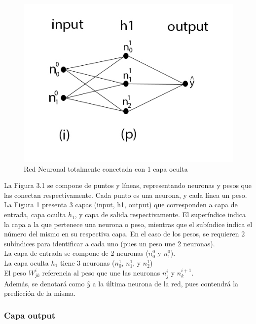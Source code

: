 \begin{figure}[H]
	\centering
	\includegraphics[scale=0.35]{imagenes/nn_1_capa.jpg}  
	\caption{Red Neuronal totalmente conectada con 1 capa oculta}
	\label{fig:nn_1_capa}
\end{figure}

La Figura 3.1 se compone de puntos y líneas, representando neuronas y pesos que las conectan respectivamente. Cada punto es una neurona, y cada línea un peso. \\
La Figura \ref{fig:nn_1_capa} presenta 3 capas (input, h1, output) que corresponden a capa de entrada, capa oculta $h_1$, y capa de salida respectivamente. El superíndice indica la capa a la que pertenece una neurona o peso, mientras que el subíndice indica el número del mismo en su respectiva capa. En el caso de los pesos, se requieren 2 subíndices para identificar a cada uno (pues un peso une 2 neuronas). \\
La capa de entrada se compone de 2 neuronas ($n^{0}_0$ y $n^{0}_1$). \\
La capa oculta $h_1$ tiene 3 neuronas ($n^1_{0}$, $n^1_{1}$, y $n^1_{2}$) \\
El peso $W^{i}_{jk}$ referencia al peso que une las neuronas $n^{i}_j$ y $n^{i+1}_k$.\\
Además, se denotará como $\hat{y}$ a la última neurona de la red, pues contendrá la predicción de la misma.  

\subsubsection{Capa output}

